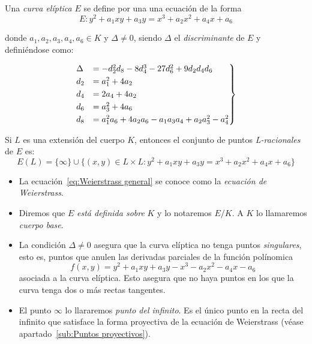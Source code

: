 \begin{definicion}
\label{def:curva elíptica}
	Una \emph{curva elíptica} $E$ se define por una una ecuación de la forma
	\begin{equation}
	\label{eq:Weierstrass general}
		E : y^2 + a_1 x y + a_3 y = x^3 + a_2 x^2 + a_4 x + a_6
	\end{equation}

	donde $a_1, a_2, a_3, a_4, a_6 \in K$ y $\Delta \neq 0$, siendo $\Delta$ el \emph{discriminante} de $E$ y definiéndose como:

	\begin{align}
		\label{eq:discriminante}
		\begin{rcases}
		\Delta & = -d_2^2 d_8 - 8 d_4^3 - 27 d_6^2 + 9 d_2 d_4 d_6         \\
		d_2    & = a_1^2 + 4 a_ 2                                          \\
		d_4    & = 2 a_4 + 4 a_2                                           \\
		d_6    & = a_3^2 + 4 a_6                                           \\
		d_8    & = a_1^2 a_6 + 4 a_2 a_6 - a_1 a_3 a_4 + a_2 a_3^2 - a_4^2 \\
		\end{rcases}
	\end{align}

	Si $L$ es una extensión del cuerpo $K$, entonces el conjunto de puntos \emph{L-racionales} de $E$ es:
	$$
	E(L) = \{\infty\} \cup \{(x, y) \in L \times L: y^2 + a_1 x y + a_3 y = x^3 + a_2 x^2 + a_4 x + a_6 \}
	$$
\end{definicion}

\begin{nota}\leavevmode
	\begin{itemize}
		\item La ecuación~\eqref{eq:Weierstrass general} se conoce como la \emph{ecuación de Weierstrass}.
		\item Diremos que $E$ \emph{está definida sobre} $K$ y lo notaremos $E/K$. A $K$ lo llamaremos \emph{cuerpo base}.
		\item La condición $\Delta \neq 0$ asegura que la curva elíptica no tenga puntos \emph{singulares}, esto es, puntos que anulen las derivadas parciales de la función polínomica
		$$
			f(x, y) = y^2 + a_1 x y + a_3 y - x^3 - a_2 x^2 - a_4 x - a_6
		$$
		asociada a la curva elíptica. Esto asegura que no haya puntos en los que la curva tenga dos o más rectas tangentes.
		\item El punto $\infty$ lo llararemos \emph{punto del infinito}. Es el único punto en la recta del infinito que satisface la forma proyectiva de la ecuación de Weierstrass (véase apartado~\ref{sub:Puntos proyectivos}).
	\end{itemize}
\end{nota}

